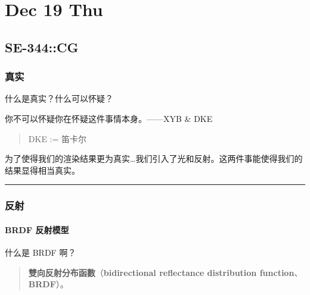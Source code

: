 \documentclass[
]{article}
\date{}
\begin{document}
\hypertarget{header-n0}{%
\section{Dec 19 Thu}\label{header-n0}}

\hypertarget{header-n2}{%
\subsection{SE-344::CG}\label{header-n2}}

\hypertarget{header-n3}{%
\subsubsection{真实}\label{header-n3}}

什么是真实？什么可以怀疑？

你不可以怀疑你在怀疑这件事情本身。------XYB \& DKE

\begin{quote}
DKE := 笛卡尔
\end{quote}

为了使得我们的渲染结果更为真实\ldots 我们引入了光和反射。这两件事能使得我们的结果显得相当真实。

\begin{center}\rule{0.5\linewidth}{\linethickness}\end{center}

\hypertarget{header-n10}{%
\subsubsection{反射}\label{header-n10}}

\hypertarget{header-n11}{%
\paragraph{BRDF 反射模型}\label{header-n11}}

什么是 BRDF 啊？

\begin{quote}
\textbf{雙向反射分布函數}（\textbf{bidirectional reflectance
distribution function}、\textbf{BRDF}）。
\end{quote}
\end{document}
